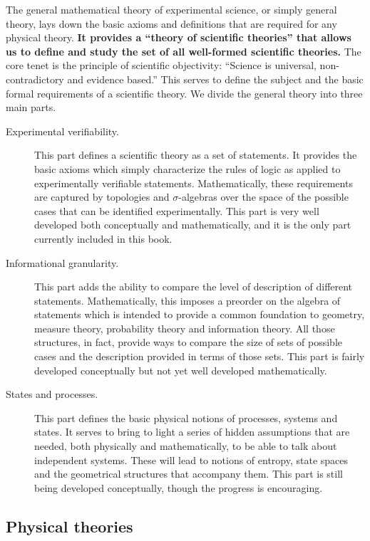 \documentclass[11pt,letterpaper,fleqn]{memoir} %
\begin{document}
The general mathematical theory of experimental science, or simply general theory, lays down the basic axioms and definitions that are required for any physical theory. \textbf{It provides a ``theory of scientific theories'' that allows us to define and study the set of all well-formed scientific theories.} The core tenet is the principle of scientific objectivity: ``Science is universal, non-contradictory and evidence based.'' This serves to define the subject and the basic formal requirements of a scientific theory. We divide the general theory into three main parts.

\begin{description}
	\item[Experimental verifiability.] This part defines a scientific theory as a set of statements. It provides the basic axioms which simply characterize the rules of logic as applied to experimentally verifiable statements. Mathematically, these requirements are captured by topologies and $\sigma$-algebras over the space of the possible cases that can be identified experimentally. This part is very well developed both conceptually and mathematically, and it is the only part currently included in this book. 
	
	\item[Informational granularity.] This part adds the ability to compare the level of description of different statements. Mathematically, this imposes a preorder on the algebra of statements which is intended to provide a common foundation to geometry, measure theory, probability theory and information theory. All those structures, in fact, provide ways to compare the size of sets of possible cases and the description provided in terms of those sets. This part is fairly developed conceptually but not yet well developed mathematically.
	
	\item[States and processes.] This part defines the basic physical notions of processes, systems and states. It serves to bring to light a series of hidden assumptions that are needed, both physically and mathematically, to be able to talk about independent systems. These will lead to notions of entropy, state spaces and the geometrical structures that accompany them. This part is still being developed conceptually, though the progress is encouraging.
\end{description}

\subsection{Physical theories}
\end{document}
